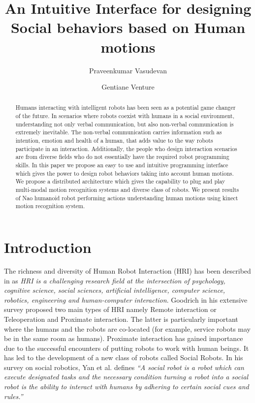 \documentclass{llncs}
\title{An Intuitive Interface for designing Social behaviors based on Human motions}
\author{Praveenkumar Vasudevan\inst{1} \and Gentiane Venture\inst{2}}
\institute{Graduate Student, \'{E}cole Centrale de Nantes, Nantes, France,\\
\email{praveenv4k@gmail.com}
\and
Associate Professor, Tokyo University of Agriculture and Technology, Japan\\
\email{venture@cc.tuat.ac.jp}}
\begin{document}
\maketitle   
\begin{abstract}
	Humans interacting with intelligent robots has been seen as a potential game changer of the future. In scenarios where robots coexist with humans in a social environment, understanding not only verbal communication, but also non-verbal communication is extremely inevitable. The non-verbal communication carries information such as intention, emotion and health of a human, that adds value to the way robots participate in an interaction. Additionally, the people who design interaction scenarios are from diverse fields who do not essentially have the required robot programming skills. In this paper we propose an easy to use and intuitive programming interface which gives the power to design robot behaviors taking into account human motions. We propose a distributed architecture which gives the capability to plug and play multi-modal motion recognition systems and diverse class of robots. We present results of Nao humanoid robot performing actions understanding human motions using kinect motion recognition system.
\end{abstract}
%
\section{Introduction}
%
The richness and diversity of Human Robot Interaction (HRI) has been described in \cite{Dautenhahn2007} as \emph{HRI is a challenging research field at the intersection of psychology, cognitive science, social sciences, artificial intelligence, computer science, robotics, engineering and human-computer interaction}. Goodrich\cite{Goodrich:2007:HIS:1348099.1348100} in his extensive survey proposed two main types of HRI namely Remote interaction or Teleoperation and Proximate interaction. The latter is particularly important where the humans and the robots are co-located (for example, service robots may be in the same room as humans). Proximate interaction has gained importance due to the successful encounters of putting robots to work with human beings. It has led to the development of a new class of robots called Social Robots. In his survey on social robotics, Yan et al. \cite{Yan2014} defines \emph{“A social robot is a robot which can execute designated tasks and the necessary condition turning a robot into a social robot is the ability to interact with humans by adhering to certain social cues and rules.”}
\end{document}
